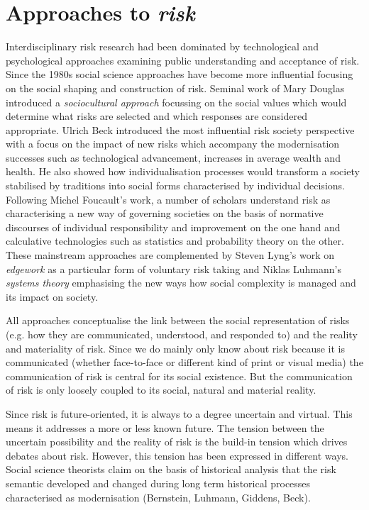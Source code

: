 \documentclass{report}
\begin{document}
\section{Approaches to \emph{risk}}

Interdisciplinary risk research had been dominated by technological and psychological approaches examining public understanding and acceptance of risk. Since the 1980s social science approaches have become more influential focusing on the social shaping and construction of risk. Seminal work of Mary Douglas introduced a \emph{sociocultural approach} focussing on the social values which would determine what risks are selected and which responses are considered appropriate. Ulrich Beck introduced the most influential risk society perspective with a focus on the impact of new risks which accompany the modernisation successes such as technological advancement, increases in average wealth and health. He also showed how individualisation processes would transform a society stabilised by traditions into social forms characterised by individual decisions. Following Michel Foucault's work, a number of scholars understand risk as characterising a new way of governing societies on the basis of normative discourses of individual responsibility and improvement on the one hand and calculative technologies such as statistics and probability theory on the other. These mainstream approaches are complemented by Steven Lyng's work on \emph{edgework} as a particular form of voluntary risk taking and Niklas Luhmann's \emph{systems theory} emphasising the new ways how social complexity is managed and its impact on society.

All approaches conceptualise the link between the social representation of risks (e.g. how they are communicated, understood, and responded to) and the reality and materiality of risk. Since we do mainly only know about risk because it is communicated (whether face-to-face or different kind of print or visual media) the communication of risk is central for its social existence. But the communication of risk is only loosely coupled to its social, natural and material reality.

Since risk is future-oriented, it is always to a degree uncertain and virtual. This means it addresses a more or less known future. The tension between the uncertain possibility and the reality of risk is the build-in tension which drives debates about risk. However, this tension has been expressed in different ways. Social science theorists claim on the basis of historical analysis that the risk semantic developed and changed during long term historical processes characterised as modernisation (Bernstein, Luhmann, Giddens, Beck).
\end{document}
